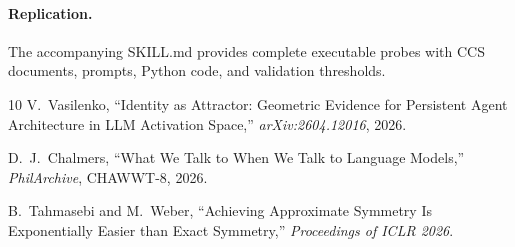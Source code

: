 \documentclass[11pt,a4paper]{article}
\begin{document}
\paragraph{Replication.} The accompanying SKILL.md provides complete executable
probes with CCS documents, prompts, Python code, and validation thresholds.

\begin{thebibliography}{10}
V.~Vasilenko, ``Identity as Attractor: Geometric Evidence for Persistent Agent
Architecture in LLM Activation Space,'' \emph{arXiv:2604.12016}, 2026.

D.~J.~Chalmers, ``What We Talk to When We Talk to Language Models,''
\emph{PhilArchive}, CHAWWT-8, 2026.

B.~Tahmasebi and M.~Weber, ``Achieving Approximate Symmetry Is Exponentially
Easier than Exact Symmetry,'' \emph{Proceedings of ICLR 2026}.
\end{thebibliography}
\end{document}
